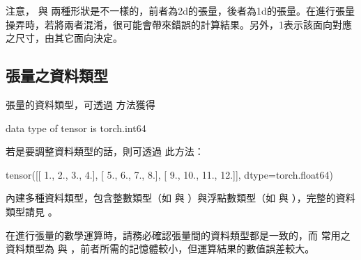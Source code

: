 \documentclass[letterpaper,10pt,english]{sphinxmanual}
\begin{document}
注意， 與  兩種形狀是不一樣的，前者為2d的張量，後者為1d的張量。在進行張量操弄時，若將兩者混淆，很可能會帶來錯誤的計算結果。另外，\sphinxhyphen{}1表示該面向對應之尺寸，由其它面向決定。


\subsection{張量之資料類型}
\label{\detokenize{notebook/lab-torch-tensor:id5}}
張量的資料類型，可透過  方法獲得

\begin{sphinxVerbatim}[commandchars=\\\{\}]
 
\end{sphinxVerbatim}

\begin{sphinxVerbatim}[commandchars=\\\{\}]
data type of tensor is torch.int64
\end{sphinxVerbatim}

若是要調整資料類型的話，則可透過  此方法：

\begin{sphinxVerbatim}[commandchars=\\\{\}]
\end{sphinxVerbatim}

\begin{sphinxVerbatim}[commandchars=\\\{\}]
tensor([[ 1.,  2.,  3.,  4.],
        [ 5.,  6.,  7.,  8.],
        [ 9., 10., 11., 12.]], dtype=torch.float64)
\end{sphinxVerbatim}

 內建多種資料類型，包含整數類型（如  與 ）與浮點數類型（如  與 ），完整的資料類型請見 。

在進行張量的數學運算時，請務必確認張量間的資料類型都是一致的，而  常用之資料類型為  與 ，前者所需的記憶體較小，但運算結果的數值誤差較大。
\end{document}
